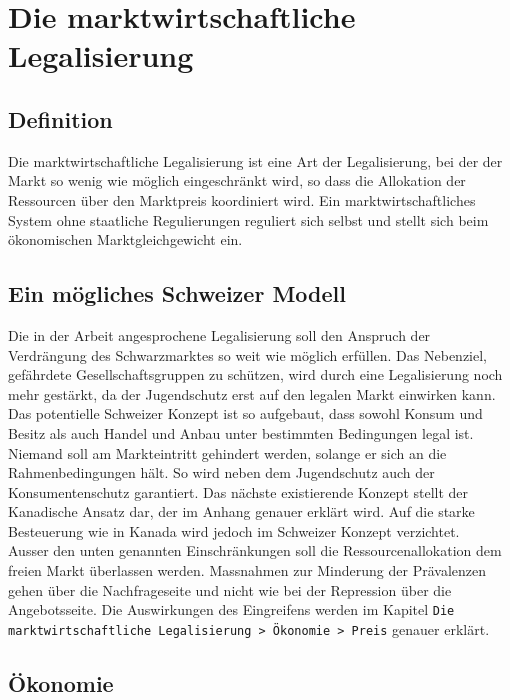 \documentclass[../main.tex]{subfiles}
\begin{document}
	 \section{Die marktwirtschaftliche Legalisierung}
	 
	 \subsection{Definition}
	 Die marktwirtschaftliche Legalisierung ist eine Art der Legalisierung, bei der der Markt so wenig wie möglich eingeschränkt wird, so dass die Allokation der Ressourcen über den Marktpreis koordiniert wird.
	 Ein marktwirtschaftliches System ohne staatliche Regulierungen reguliert sich selbst und stellt sich beim ökonomischen Marktgleichgewicht ein.
	 
	 
	 
	 \subsection{Ein mögliches Schweizer Modell}
	 Die in der Arbeit angesprochene Legalisierung soll den Anspruch der Verdrängung des Schwarzmarktes so weit wie möglich erfüllen.
	 Das Nebenziel, gefährdete Gesellschaftsgruppen zu schützen, wird durch eine Legalisierung noch mehr gestärkt, da der Jugendschutz erst auf den legalen Markt einwirken kann.
	 Das potentielle Schweizer Konzept ist so aufgebaut, dass sowohl Konsum und Besitz als auch Handel und Anbau unter bestimmten Bedingungen legal ist.
	 Niemand soll am Markteintritt gehindert werden, solange er sich an die Rahmenbedingungen hält.
	 So wird neben dem Jugendschutz auch der Konsumentenschutz garantiert.
	 Das nächste existierende Konzept stellt der Kanadische Ansatz dar, der im Anhang genauer erklärt wird.
	 Auf die starke Besteuerung wie in Kanada wird jedoch im Schweizer Konzept verzichtet.\\
	 
	 \noindent
	 Ausser den unten genannten Einschränkungen soll die Ressourcenallokation dem freien Markt überlassen werden. 	 
	 Massnahmen zur Minderung der Prävalenzen gehen über die Nachfrageseite und nicht wie bei der Repression über die Angebotsseite.
	 Die Auswirkungen des Eingreifens werden im Kapitel \texttt{Die marktwirtschaftliche Legalisierung > Ökonomie > Preis} genauer erklärt.
	 
	 
	 \subsection{Ökonomie}
	 
\end{document}
